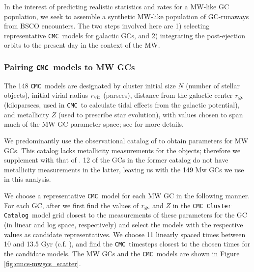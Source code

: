 \documentclass[twocolumn]{aastex631}
\newcommand{\CMC}{\texttt{CMC}}
\newcommand{\CMCcat}{\texttt{CMC Cluster Catalog}}
\begin{document}
In the interest of predicting realistic statistics and rates for a MW-like GC population, we seek to assemble a synthetic MW-like population of GC-runaways from BSCO encounters.
The two steps involved here are 1) selecting representative \CMC\ models for galactic GCs, and 2) integrating the post-ejection orbits to the present day in the context of the MW.

\subsubsection{Pairing \CMC\ models to MW GCs} \label{subsubsec:pairing}

The 148 \CMC\ models are designated by cluster initial size $N$ (number of stellar objects), initial virial radius $r_{\rm vir}$ (parsecs), distance from the galactic center $r_{\rm gc}$ (kiloparsecs, used in \CMC\ to calculate tidal effects from the galactic potential), and metallicity $Z$ (used to prescribe star evolution), with values chosen to span much of the MW GC parameter space; see \citet{2020IAUS..351..357K} for more details.

We predominantly use the observational catalog of \citet{2018MNRAS.478.1520B} to obtain parameters for MW GCs.
This catalog lacks metallicity measurements for the objects; therefore we supplement with that of \citet{2010arXiv1012.3224H}.
12 of the GCs in the former catalog do not have metallicity measurements in the latter, leaving us with the 149 Mw GCs we use in this analysis.

We choose a representative \CMC\ model for each MW GC in the following manner.
For each GC, after \citet{2021ApJ...912..102R} we first find the values of $r_{\rm gc}$ and $Z$ in the \CMCcat\ model grid closest to the measurements of these parameters for the GC (in linear and log space, respectively) and select the models with the respective values as candidate representatives.
We choose 11 linearly spaced times between 10 and 13.5 Gyr (c.f. \citet{2013ApJ...775..134V}), and find the \CMC\ timesteps closest to the chosen times for the candidate models.
The MW GCs and the \CMC\ models are shown in Figure \ref{fig:cmcs-mwgcs_scatter}.
\end{document}
